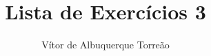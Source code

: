 \documentclass{article}
\begin{document}
	
\title{Lista de Exercícios 3}
\author{Vítor de Albuquerque Torreão}
	
\maketitle
	
\end{document}
